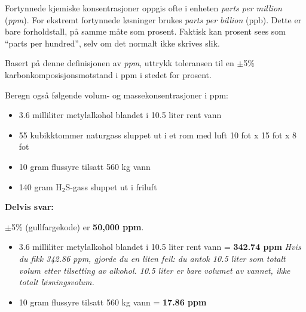 

Fortynnede kjemiske konsentrasjoner oppgis ofte i enheten {\it parts per million} ({\it ppm}). For ekstremt fortynnede løsninger brukes {\it parts per billion} (ppb). Dette er bare forholdstall, på samme måte som prosent. Faktisk kan prosent sees som ``parts per hundred'', selv om det normalt ikke skrives slik.

\vskip 10pt

Basert på denne definisjonen av {\it ppm}, uttrykk toleransen til en $\pm$5\% karbonkomposisjonsmotstand i ppm i stedet for prosent.

\vskip 10pt

Beregn også følgende volum- og massekonsentrasjoner i ppm:

\begin{itemize}
\item{} 3.6 milliliter metylalkohol blandet i 10.5 liter rent vann
\vskip 10pt
\item{} 55 kubikktommer naturgass sluppet ut i et rom med luft 10 fot x 15 fot x 8 fot
\vskip 10pt
\item{} 10 gram flussyre tilsatt 560 kg vann
\vskip 10pt
\item{} 140 gram H$_{2}$S-gass sluppet ut i friluft
\end{itemize}

\vskip 10pt







\noindent
{\bf Delvis svar:}

\vskip 10pt

$\pm$5\% (gullfargekode) er {\bf 50,000 ppm}.

\begin{itemize}
\item{} 3.6 milliliter metylalkohol blandet i 10.5 liter rent vann = {\bf 342.74 ppm}  {\it Hvis du fikk 342.86 ppm, gjorde du en liten feil: du antok 10.5 liter som totalt volum etter tilsetting av alkohol. 10.5 liter er bare volumet av vannet, ikke totalt løsningsvolum.}
\vskip 10pt
\item{} 10 gram flussyre tilsatt 560 kg vann = {\bf 17.86 ppm}
\vskip 10pt
\end{itemize}

